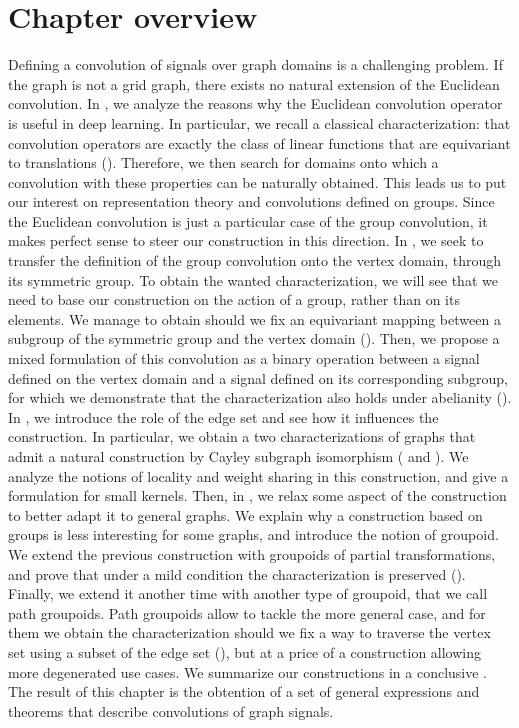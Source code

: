 \section*{Chapter overview}

Defining a convolution of signals over graph domains is a challenging problem. If the graph is not a grid graph, there exists no natural extension of the Euclidean convolution. In , we analyze the reasons why the Euclidean convolution operator is useful in deep learning. In particular, we recall a classical characterization: that convolution operators are exactly the class of linear functions that are equivariant to translations (). Therefore, we then search for domains onto which a convolution with these properties can be naturally obtained. This leads us to put our interest on representation theory and convolutions defined on groups. Since the Euclidean convolution is just a particular case of the group convolution, it makes perfect sense to steer our construction in this direction. In , we seek to transfer the definition of the group convolution onto the vertex domain, through its symmetric group. To obtain the wanted characterization, we will see that we need to base our construction on the action of a group, rather than on its elements. We manage to obtain should we fix an equivariant mapping between a subgroup of the symmetric group and the vertex domain (). Then, we propose a mixed formulation of this convolution as a binary operation between a signal defined on the vertex domain and a signal defined on its corresponding subgroup, for which we demonstrate that the characterization also holds under abelianity (). In , we introduce the role of the edge set and see how it influences the construction. In particular, we obtain a two characterizations of graphs that admit a natural construction by Cayley subgraph isomorphism ( and ). We analyze the notions of locality and weight sharing in this construction, and give a formulation for small kernels. Then, in , we relax some aspect of the construction to better adapt it to general graphs. We explain why a construction based on groups is less interesting for some graphs, and introduce the notion of groupoid. We extend the previous construction with groupoids of partial transformations, and prove that under a mild condition the characterization is preserved (). Finally, we extend it another time with another type of groupoid, that we call path groupoids. Path groupoids allow to tackle the more general case, and for them we obtain the characterization should we fix a way to traverse the vertex set using a subset of the edge set (), but at a price of a construction allowing more degenerated use cases. We summarize our constructions in a conclusive . The result of this chapter is the obtention of a set of general expressions and theorems that describe convolutions of graph signals.